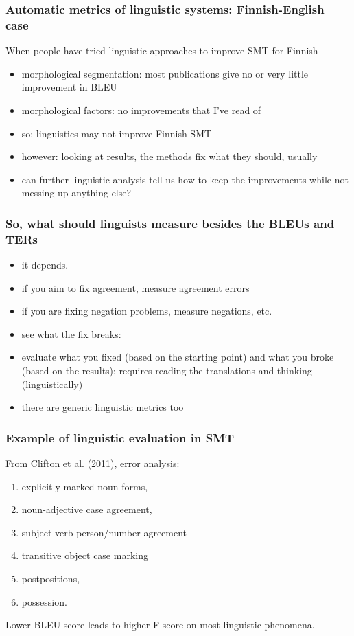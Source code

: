 \documentclass{beamer}
\begin{document}
\begin{frame}
    \frametitle{Automatic metrics of linguistic systems: Finnish-English case}
    When people have tried linguistic approaches to improve SMT for Finnish
    \begin{itemize}
        \item morphological segmentation: most publications give no or very little improvement in BLEU
        \item morphological factors: no improvements that I've read of
        \item so: linguistics may not improve Finnish SMT
        \item however: looking at results, the methods fix what they should, usually
        \item can further linguistic analysis tell us how to keep
            the improvements while not messing up anything else?
    \end{itemize}
\end{frame}


\begin{frame}
    \frametitle{So, what should linguists measure besides the BLEUs and TERs}
    \begin{itemize}
        \item it depends.
        \item if you aim to fix agreement, measure agreement errors
        \item if you are fixing negation problems, measure negations, etc.
        \item see what the fix breaks:
        \item evaluate what you fixed (based on the starting point)
            and what you broke (based on the results); requires reading the
            translations and thinking (linguistically)
        \item there are generic linguistic metrics too
    \end{itemize}
\end{frame}

\begin{frame}
    \frametitle{Example of linguistic evaluation in SMT}
    From Clifton et al. (2011), error analysis:
    \begin{enumerate}
        \item  explicitly marked noun forms,
        \item noun-adjective case agreement,
        \item subject-verb person/number agreement
        \item transitive object case marking
        \item postpositions,
        \item possession.
    \end{enumerate}
    Lower BLEU score leads to higher F-score on
    most linguistic phenomena.
\end{frame}
\end{document}
